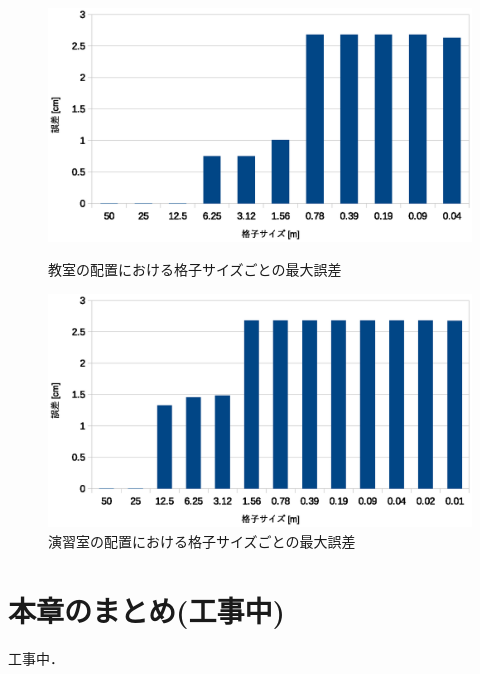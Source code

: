 \begin{figure}[tb]
	\begin{minipage}[b]{0.48\columnwidth}
		\begin{center}
		\includegraphics[width=\columnwidth]{figure/20231016_kyositu_gosa.eps}
		\caption{教室の配置における格子サイズごとの最大誤差}
		\label{fig:kyositu_gosa}
		\end{center}
	\end{minipage}
	\hspace{0.04\columnwidth}
	\begin{minipage}[b]{0.48\columnwidth}
		\begin{center}
		\includegraphics[width=\columnwidth]{figure/20231016_pc_gosa.eps}
		\caption{演習室の配置における格子サイズごとの最大誤差}
		\label{fig:pc_gosa}
		\end{center}
	\end{minipage}
\end{figure}




\clearpage
\section{本章のまとめ(工事中)}
工事中．
